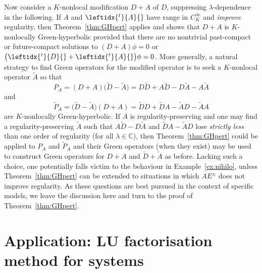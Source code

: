 \documentclass[pdftex]{sigma}
\numberwithin{equation}{section}
\newcommand{\CC}{{\mathbb C}}
\newcommand{\adj}[1]{\leftidx{^{t}}{#1}{}}
\begin{document}
 Now consider a $K$-nonlocal modification $D+ A$ of $D$, suppressing $\lambda$-dependence in the following. If $A$ and $\adj{A}$ have range in $C^\infty_K$ and \emph{improve} regularity, then Theorem~\ref{thm:GHpert} applies and shows that $D+ A$ is $K$-nonlocally Green-hyperbolic provided that there are no nontrivial past-compact or future-compact solutions to $(D+A)\phi=0$ or $\big(\adj{D}+\adj{A}\big)\phi=0$. More generally, a natural strategy to find Green operators for the modified operator is to seek a $K$-nonlocal operator $\tilde{A}$ so that
 \begin{equation*}
 	P_A = (D+A)\big(\tilde{D}-\tilde{A}\big) = D\tilde{D} +A\tilde{D}-D \tilde{A} - A\tilde{A}
 \end{equation*}
 and
 \begin{equation*}
 	\tilde{P}_A = \big(\tilde{D}-\tilde{A}\big)(D+A) = \tilde{D}D +\tilde{D}A -\tilde{A}D - \tilde{A}A
 \end{equation*}
 are $K$-nonlocally Green-hyperbolic. If $A$ is regularity-preserving and one may find a
 regularity-preserving $\tilde{A}$ such that $A\tilde{D}-D\tilde{A}$ and $\tilde{D}A -\tilde{A}D$ lose \emph{strictly less} than one order of regularity (for all $\lambda\in\CC$), then Theorem~\ref{thm:GHpert} could be applied to $P_A$ and $\tilde{P}_A$ and their Green operators (when they exist) may be used to construct Green operators for $D+A$ and $\tilde{D}+\tilde{A}$ as before. Lacking such a choice, one potentially falls victim to the behaviour in Example~\ref{ex:nihilo}, unless Theorem~\ref{thm:GHpert} can be extended to situations in which $AE^\pm$ does not improve regularity.
 As these questions are best pursued in the context of specific models, we leave the discussion here
 and turn to the proof of Theorem~\ref{thm:GHpert}.

 \section{Application: LU factorisation method for systems}\label{sec:LU}
\end{document}
